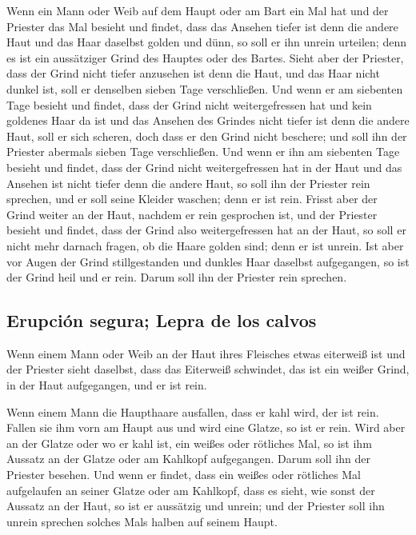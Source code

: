  Wenn ein Mann oder Weib auf dem Haupt oder am Bart ein
Mal hat  und der Priester das Mal besieht und findet,
dass das Ansehen tiefer ist denn die andere Haut und das Haar daselbst
golden und dünn, so soll er ihn unrein urteilen; denn es ist ein
aussätziger Grind des Hauptes oder des Bartes.  Sieht
aber der Priester, dass der Grind nicht tiefer anzusehen ist denn die
Haut, und das Haar nicht dunkel ist, soll er denselben sieben Tage
verschließen.  Und wenn er am siebenten Tage besieht und
findet, dass der Grind nicht weitergefressen hat und kein goldenes Haar
da ist und das Ansehen des Grindes nicht tiefer ist denn die andere
Haut,  soll er sich scheren, doch dass er den Grind nicht
beschere; und soll ihn der Priester abermals sieben Tage verschließen.
 Und wenn er ihn am siebenten Tage besieht und findet,
dass der Grind nicht weitergefressen hat in der Haut und das Ansehen ist
nicht tiefer denn die andere Haut, so soll ihn der Priester rein
sprechen, und er soll seine Kleider waschen; denn er ist rein.
 Frisst aber der Grind weiter an der Haut, nachdem er
rein gesprochen ist,  und der Priester besieht und
findet, dass der Grind also weitergefressen hat an der Haut, so soll er
nicht mehr darnach fragen, ob die Haare golden sind; denn er ist unrein.
 Ist aber vor Augen der Grind stillgestanden und dunkles
Haar daselbst aufgegangen, so ist der Grind heil und er rein. Darum soll
ihn der Priester rein sprechen.

\hypertarget{erupciuxf3n-segura-lepra-de-los-calvos}{%
\subsection{Erupción segura; Lepra de los
calvos}\label{erupciuxf3n-segura-lepra-de-los-calvos}}

 Wenn einem Mann oder Weib an der Haut ihres Fleisches
etwas eiterweiß ist  und der Priester sieht daselbst,
dass das Eiterweiß schwindet, das ist ein weißer Grind, in der Haut
aufgegangen, und er ist rein.

 Wenn einem Mann die Haupthaare ausfallen, dass er kahl
wird, der ist rein.  Fallen sie ihm vorn am Haupt aus und
wird eine Glatze, so ist er rein.  Wird aber an der
Glatze oder wo er kahl ist, ein weißes oder rötliches Mal, so ist ihm
Aussatz an der Glatze oder am Kahlkopf aufgegangen. 
Darum soll ihn der Priester besehen. Und wenn er findet, dass ein weißes
oder rötliches Mal aufgelaufen an seiner Glatze oder am Kahlkopf, dass
es sieht, wie sonst der Aussatz an der Haut,  so ist er
aussätzig und unrein; und der Priester soll ihn unrein sprechen solches
Mals halben auf seinem Haupt.

